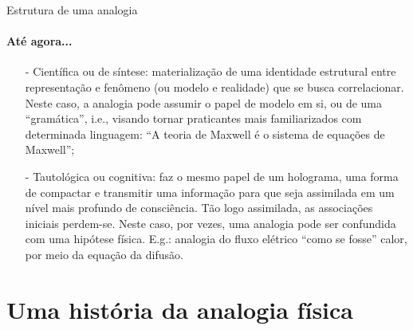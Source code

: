 \documentclass[aspectratio=169]{beamer}
\begin{document}
\begin{frame}{Estrutura de uma analogia}
\framesubtitle{Até agora...}
\begin{itemize}
	\item[-] Científica ou de síntese: materialização de uma identidade estrutural entre representação e fenômeno (ou modelo e realidade) que se busca correlacionar. Neste caso, a analogia pode assumir o papel de modelo em si, ou de uma ``gramática'', i.e., visando tornar praticantes mais familiarizados com determinada linguagem: ``A teoria de Maxwell é o sistema de equações de Maxwell'';\cite{hertz1893}
	
	\item[-] Tautológica ou cognitiva: faz o mesmo papel de um holograma, uma forma de compactar e transmitir uma informação para que seja assimilada em um nível mais profundo de consciência. Tão logo assimilada, as associações iniciais perdem-se. Neste caso, por vezes, uma analogia pode ser confundida com uma hipótese física. E.g.: analogia do fluxo elétrico ``como se fosse'' calor, por meio da equação da difusão. %
\end{itemize}
\end{frame}

\section{Uma história da analogia física}
\end{document}
